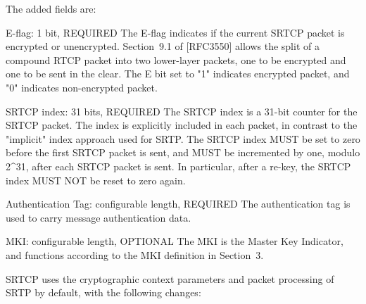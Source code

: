 \documentclass{article}
\begin{document}
The added fields are:

E-flag: 1 bit, REQUIRED The E-flag indicates if the current SRTCP packet is encrypted or unencrypted.  Section~9.1 of [RFC3550] allows the split of a compound RTCP packet into two lower-layer packets, one to be encrypted and one to be sent in the clear.  The E bit set to "1" indicates encrypted packet, and "0" indicates non-encrypted packet.

SRTCP index: 31 bits, REQUIRED The SRTCP index is a 31-bit counter for the SRTCP packet. The index is explicitly included in each packet, in contrast to the "implicit" index approach used for SRTP.  The SRTCP index MUST be set to zero before the first SRTCP packet is sent, and MUST be incremented by one, modulo 2\textasciicircum{}31, after each SRTCP packet is sent.  In particular, after a re-key, the SRTCP index MUST NOT be reset to zero again.

Authentication Tag: configurable length, REQUIRED The authentication tag is used to carry message authentication data.

MKI: configurable length, OPTIONAL The MKI is the Master Key Indicator, and functions according to the MKI definition in Section~3.

SRTCP uses the cryptographic context parameters and packet processing of SRTP by default, with the following changes:
\end{document}
